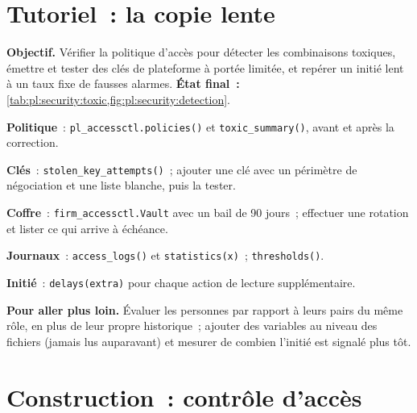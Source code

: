 \section{Tutoriel~: la copie lente}\label{tut:pl:security:tut}

\begin{tutorial}
\textbf{Objectif.} Vérifier la politique d'accès pour détecter les combinaisons toxiques, émettre et tester des clés de plateforme à portée limitée, et repérer un initié lent à un taux fixe de fausses
alarmes. \textbf{État final~:} \cref{tab:pl:security:toxic,fig:pl:security:detection}.
\begin{tutsteps}
\item \textbf{Politique}~: \texttt{pl\_accessctl.policies()} et \texttt{toxic\_summary()}, avant et après la correction.
\item \textbf{Clés}~: \texttt{stolen\_key\_attempts()}~; ajouter une clé avec un périmètre de négociation et une liste blanche, puis la tester.
\item \textbf{Coffre}~: \texttt{firm\_accessctl.Vault} avec un bail de 90 jours~; effectuer une rotation et lister ce qui arrive à échéance.
\item \textbf{Journaux}~: \texttt{access\_logs()} et \texttt{statistics(x)}~; \texttt{thresholds()}.
\item \textbf{Initié}~: \texttt{delays(extra)} pour chaque action de lecture supplémentaire.
\end{tutsteps}
\textbf{Pour aller plus loin.} Évaluer les personnes par rapport à leurs pairs du même rôle, en plus de leur propre historique~; ajouter des variables au niveau des
fichiers (jamais lus auparavant) et mesurer de combien l'initié est signalé plus tôt.
\end{tutorial}

\section{Construction~: contrôle d'accès}\label{bld:pl:security:accessctl}

